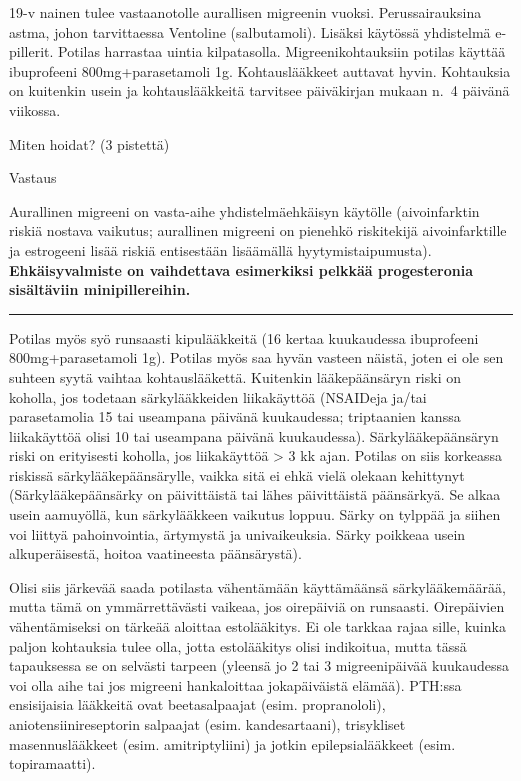 \documentclass[
]{book}
\begin{document}
19-v nainen tulee vastaanotolle aurallisen migreenin vuoksi. Perussairauksina astma, johon tarvittaessa Ventoline (salbutamoli). Lisäksi käytössä yhdistelmä e-pillerit. Potilas harrastaa uintia kilpatasolla. Migreenikohtauksiin potilas käyttää ibuprofeeni 800mg+parasetamoli 1g. Kohtauslääkkeet auttavat hyvin. Kohtauksia on kuitenkin usein ja kohtauslääkkeitä tarvitsee päiväkirjan mukaan n.~4 päivänä viikossa.

Miten hoidat? (3 pistettä)

Vastaus

Aurallinen migreeni on vasta-aihe yhdistelmäehkäisyn käytölle (aivoinfarktin riskiä nostava vaikutus; aurallinen migreeni on pienehkö riskitekijä aivoinfarktille ja estrogeeni lisää riskiä entisestään lisäämällä hyytymistaipumusta). \textbf{Ehkäisyvalmiste on vaihdettava esimerkiksi pelkkää progesteronia sisältäviin minipillereihin.}

\begin{center}\rule{0.5\linewidth}{0.5pt}\end{center}

Potilas myös syö runsaasti kipulääkkeitä (16 kertaa kuukaudessa ibuprofeeni 800mg+parasetamoli 1g). Potilas myös saa hyvän vasteen näistä, joten ei ole sen suhteen syytä vaihtaa kohtauslääkettä. Kuitenkin lääkepäänsäryn riski on koholla, jos todetaan särkylääkkeiden liikakäyttöä (NSAIDeja ja/tai parasetamolia 15 tai useampana päivänä kuukaudessa; triptaanien kanssa liikakäyttöä olisi 10 tai useampana päivänä kuukaudessa). Särkylääkepäänsäryn riski on erityisesti koholla, jos liikakäyttöä \textgreater{} 3 kk ajan. Potilas on siis korkeassa riskissä särkylääkepäänsärylle, vaikka sitä ei ehkä vielä olekaan kehittynyt (Särkylääkepäänsärky on päivittäistä tai lähes päivittäistä päänsärkyä. Se alkaa usein aamuyöllä, kun särkylääkkeen vaikutus loppuu. Särky on tylppää ja siihen voi liittyä pahoinvointia, ärtymystä ja univaikeuksia. Särky poikkeaa usein alkuperäisestä, hoitoa vaatineesta päänsärystä).

Olisi siis järkevää saada potilasta vähentämään käyttämäänsä särkylääkemäärää, mutta tämä on ymmärrettävästi vaikeaa, jos oirepäiviä on runsaasti. Oirepäivien vähentämiseksi on tärkeää aloittaa estolääkitys. Ei ole tarkkaa rajaa sille, kuinka paljon kohtauksia tulee olla, jotta estolääkitys olisi indikoitua, mutta tässä tapauksessa se on selvästi tarpeen (yleensä jo 2 tai 3 migreenipäivää kuukaudessa voi olla aihe tai jos migreeni hankaloittaa jokapäiväistä elämää). PTH:ssa ensisijaisia lääkkeitä ovat beetasalpaajat (esim. propranololi), aniotensiinireseptorin salpaajat (esim. kandesartaani), trisykliset masennuslääkkeet (esim. amitriptyliini) ja jotkin epilepsialääkkeet (esim. topiramaatti).
\end{document}

